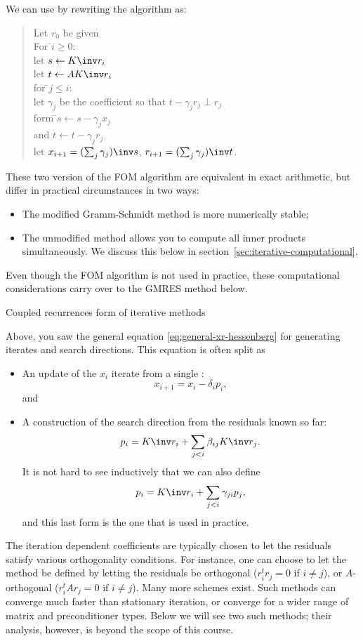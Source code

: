 We can
use  by rewriting the algorithm
as:
\begin{quote}
  \begin{tabbing}
    Let $r_0$ be given\\
    For \=$i\geq 0$:\\
    \>let $s\leftarrow K\inv r_i$\\
    \>let $t\leftarrow AK\inv r_i$\\
    \>for \=$j\leq i$:\\
    \>\>let $\gamma_j$ be the coefficient so that $t-\gamma_jr_j\perp r_j$\\
    \>\>form \=$s\leftarrow s-\gamma_jx_j$\\
    \>\>and  \>$t\leftarrow t-\gamma_jr_j$\\
    \>let $x_{i+1}=(\sum_j\gamma_j)\inv s$,
    $r_{i+1}=(\sum_j\gamma_j)\inv t$.\\
  \end{tabbing}
\end{quote}
These two version of the \ac{FOM} algorithm are 
equivalent in exact arithmetic, but differ in practical circumstances
in two ways:
\begin{itemize}
\item The modified Gramm-Schmidt method is more numerically stable;
\item The unmodified method allows you to compute all inner products
  simultaneously. We discuss this below in
  section~\ref{sec:iterative-computational}.
\end{itemize}
Even though the \ac{FOM} algorithm is not used in practice, these
computational considerations carry over to the \ac{GMRES} method
below.

 {Coupled recurrences form of iterative methods}

Above, you saw the general equation \eqref{eq:general-xr-hessenberg}
for generating iterates and search directions.
This equation is often split as
\begin{itemize}
\item An update of the $x_i$ iterate from a single :
\[ x_{i+1}=x_i-\delta_i p_i, \] and
\item A construction of the search direction from the residuals known
  so far:
  \[ p_i = K\inv r_i+\sum_{j<i}\beta_{ij} K\inv r_j. \]
  It is not hard to see inductively that we can also define
  \[ p_i = K\inv r_i+\sum_{j<i}\gamma_{ji} p_j, \]
  and this last form is the one that is used in practice.
\end{itemize}
The iteration dependent coefficients are typically chosen to let the
residuals satisfy various orthogonality conditions. For instance, one
can choose to let the method be defined by letting the residuals be
orthogonal ($r_i^tr_j=0$ if $i\not=j$), or $A$-orthogonal
($r_i^tAr_j=0$ if $i\not=j$). Many more schemes exist.  Such methods
can converge much faster than stationary iteration, or converge for a
wider range of matrix and preconditioner types. Below we will see two
such methods; their analysis, however, is beyond the scope of this
course.

